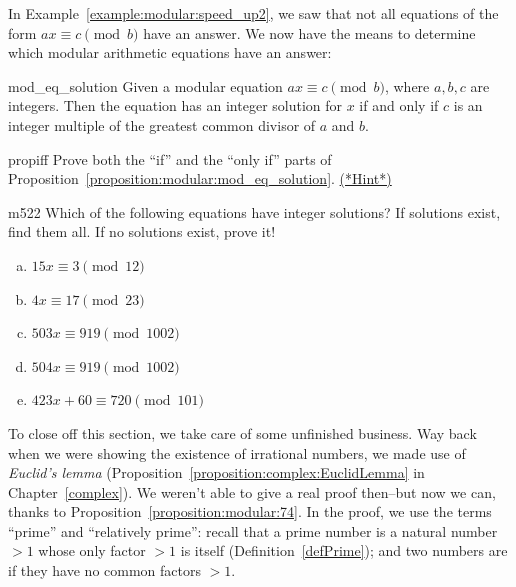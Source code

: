 In Example~\ref{example:modular:speed_up2}, we saw that not all equations of the form $ax \equiv c \pmod b$ have an answer.  We  now have the means to determine which modular arithmetic equations have an answer:

\begin{prop}{mod_eq_solution} 
Given a modular equation $ax \equiv c\pmod{b}$, where $a,b,c$ are  integers. Then the equation has an integer solution for $x$ if and only if $c$ is an integer multiple of the greatest common divisor of $a$ and $b$.  
\end{prop}

\begin{exercise}{propiff}
Prove both the ``if''  and the ``only if'' parts of Proposition~\ref{proposition:modular:mod_eq_solution}.
\hyperref[sec:modular_arithmetic:hints]{(*Hint*)}
\end{exercise}


\begin{exercise}{m522}
Which of the following equations have integer solutions? If solutions exist, find them all. If no solutions exist, prove it!
\begin{enumerate}[(a)]
\item
$15x \equiv 3 \pmod{12}$
\item
$4x \equiv 17 \pmod{23}$
\item
$503x \equiv 919 \pmod{1002}$
\item
$504x \equiv 919 \pmod{1002}$
\item
$423x + 60 \equiv 720 \pmod{101}$
\end{enumerate}

\end{exercise}

To close off this section, we take care of some unfinished business. Way back when we were showing the existence of irrational numbers, we made use of \emph{Euclid's lemma} (Proposition~\ref{proposition:complex:EuclidLemma} in Chapter~\ref{complex}). We weren't able to give a real proof then--but now we can, thanks to Proposition~\ref{proposition:modular:74}. In the proof, we use the terms ``prime'' and ``relatively prime'': recall that a prime number is a natural number $>1$ whose only factor $>1$ is itself (Definition~\ref{defPrime}); and two numbers are  if they have no common factors $>1$.

